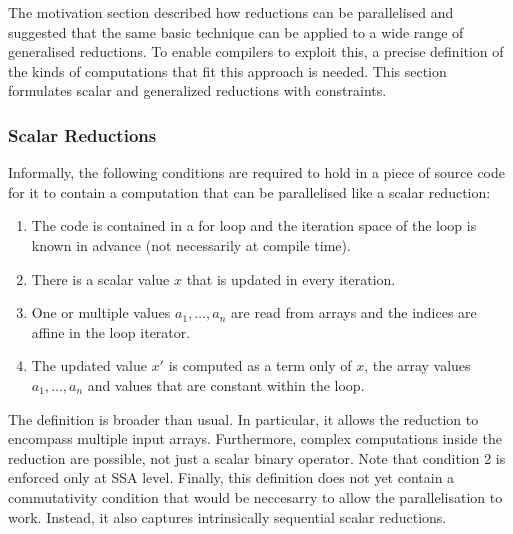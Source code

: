     The motivation section described how reductions can be parallelised and
    suggested that the same basic technique can be applied to a wide range of
    generalised reductions.
    To enable compilers to exploit this, a precise definition of the kinds
    of computations that fit this approach is needed.
    This section formulates scalar and generalized reductions with constraints.

\subsubsection{Scalar Reductions}
\label{section:scalarcond}

    Informally, the following conditions are required to hold in a piece of
    source code for it to contain a computation that can be parallelised like a
    scalar reduction:
    \begin{enumerate}
        \item The code is contained in a for loop and the iteration space of the
              loop is known in advance (not necessarily at compile time).
        \item There is a scalar value $x$ that is updated in every iteration.
        \item One or multiple values $a_1,\dots,a_n$ are read from arrays and
              the indices are affine in the loop iterator.
        \item The updated value $x'$ is computed as a term only of $x$, the
              array values $a_1,\dots,a_n$ and values that are constant within
              the loop.
    \end{enumerate}

    The definition is broader than usual.
    In particular, it allows the reduction to encompass multiple input arrays.
    Furthermore, complex computations inside the reduction are possible, not
    just a scalar binary operator.
    Note that condition 2 is enforced only at SSA level.
    Finally, this definition does not yet contain a commutativity condition that
    would be neccesarry to allow the parallelisation to work.
    Instead, it also captures intrinsically sequential scalar reductions.

